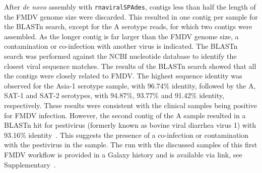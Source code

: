 After \textit{de novo} assembly with \texttt{rnaviralSPAdes}, contigs less than half the length of the \ac{FMDV} genome size were discarded. This resulted in one contig per sample for the \ac{BLAST}n search, except for the A serotype reads, for which two contigs were assembled. As the longer contig is far larger than the \ac{FMDV} genome size, a contamination or co-infection with another virus is indicated. The \ac{BLAST}n search was performed against the \ac{NCBI} nucleotide database to identify the closest viral sequence matches. The results of the \ac{BLAST}n search showed that all the contigs were closely related to \ac{FMDV}. The highest sequence identity was observed for the Asia-1 serotype sample, with 96.74\% identity, followed by the A, SAT-1 and SAT-2 serotypes, with 94.87\%, 93.77\% and 91.42\% identity, respectively. These results were consistent with the clinical samples being positive for \ac{FMDV} infection. However, the second contig of the A sample resulted in a \ac{BLAST}n hit for pestivirus (formerly known as bovine viral diarrhea virus 1) with 93.16\% identity~\cite{smith2017proposed}. This suggests the presence of a co-infection or contamination with the pestivirus in the sample. The run with the discussed samples of this first \ac{FMDV} workflow is provided in a Galaxy history and is available via link, see Supplementary~.

